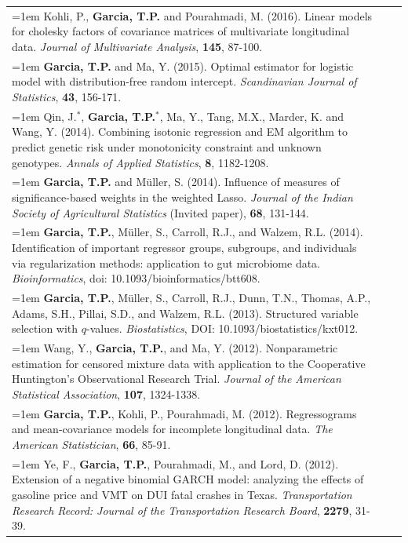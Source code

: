 \documentclass[12pt]{article}
\makeatletter
\newcounter{myCounter}
\newcounter{myCounterThree}
\newcommand*{\myCounterThreeLast}{%
  \zref@extractdefault{LastPage}{myCounterThree}{0}%
}
\renewcommand*{\themyCounterThree}{%
  \@arabic{\numexpr\myCounterThreeLast+1-\value{myCounterThree}\relax}%
}
\def\JASA{{\it Journal of the American Statistical Association}}
\def\JASA{{\it Journal of the American Statistical Association}}
\def\JASA{{\it Journal of the American Statistical Association}}
\newcommand{\removespace}{\vspace{-2.5ex}}
\def\bam{\begin{addmargin}[1em]{1.25em}}
\def\eam{\end{addmargin}}
\def\ben{\newline\bam\removespace}
\def\een{\removespace\eam}
\def\myhang{\hangindent=1em
\hangafter=1}
\makeatother
\begin{document}
\begin{longtable}{@{\stepcounter{myCounterThree}
\themyCounterThree.\hspace*{\tabcolsep}}p{15cm} p{0cm} l}
%
%
\myhang
Kohli, P., {\bf Garcia, T.P.} and Pourahmadi, M. (2016). Linear models for cholesky factors of covariance matrices of multivariate longitudinal data. \emph{Journal of Multivariate Analysis}, {\bf 145}, 87-100.\\
%
%
\myhang
{\bf Garcia, T.P.} and Ma, Y. (2015). Optimal estimator for logistic model with
distribution-free random intercept. \emph{Scandinavian Journal of Statistics}, {\bf 43}, 156-171.\\
%
\myhang
Qin, J.$^*$,  {\bf Garcia, T.P.}$^*$, Ma, Y., Tang, M.X., Marder, K. and Wang, Y. (2014). Combining isotonic regression and EM algorithm to predict genetic risk under monotonicity constraint and unknown genotypes. \emph{Annals of Applied Statistics}, {\bf 8}, 1182-1208.
\\
%
%
\myhang
{\bf Garcia, T.P.} and M\"uller, S. (2014).  Influence of measures of significance-based weights in the weighted Lasso. \emph{Journal of the Indian Society of Agricultural Statistics} (Invited paper), {\bf 68}, 131-144.\\
%
%
\myhang
{\bf Garcia, T.P.}, M\"uller, S., Carroll, R.J., and Walzem, R.L. (2014). Identification of important regressor groups, subgroups, and individuals via regularization methods: application to gut microbiome data. \emph{Bioinformatics}, doi: 10.1093/bioinformatics/btt608.\\
%
%
\myhang
 {\bf Garcia, T.P.}, M\"uller, S., Carroll, R.J., Dunn, T.N., Thomas, A.P., Adams, S.H., Pillai, S.D.,  and Walzem, R.L. (2013). Structured variable selection with $q$-values.  \emph{Biostatistics}, DOI: 10.1093/biostatistics/kxt012.\\
%
%
\myhang
Wang, Y., {\bf Garcia, T.P.}, and Ma, Y. (2012).  Nonparametric estimation for censored mixture data with application to the Cooperative Huntington's Observational Research Trial. \JASA, {\bf 107}, 1324-1338.\\
%
%
\myhang
{\bf Garcia, T.P.}, Kohli, P., Pourahmadi, M. (2012).  Regressograms and mean-covariance models for incomplete longitudinal data. \emph{The American Statistician}, {\bf 66}, 85-91.\\
%
%
\myhang
Ye, F., {\bf Garcia, T.P.}, Pourahmadi, M., and Lord, D. (2012). Extension of a negative binomial GARCH model: analyzing the effects of gasoline price and VMT on DUI fatal crashes in Texas. \emph{Transportation Research Record: Journal of the Transportation Research Board}, {\bf 2279}, 31-39.\\

\end{longtable}
\end{document}
